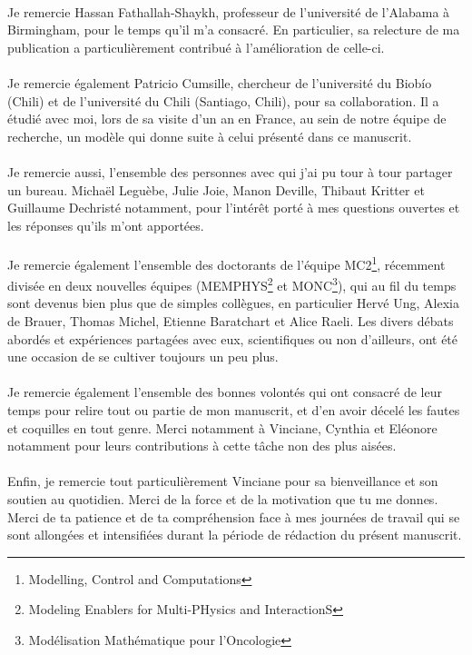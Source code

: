 \paragraph{}
Je remercie Hassan Fathallah-Shaykh, professeur de l'université de l'Alabama à Birmingham, pour le temps qu'il m'a consacré. En particulier, sa relecture de ma publication a particulièrement contribué  à l'amélioration de celle-ci.

\paragraph{}
Je remercie également Patricio Cumsille, chercheur de l'université du Biobío (Chili) et de l'université du Chili (Santiago, Chili), pour sa collaboration. Il a étudié avec moi, lors de sa visite d'un an en France, au sein de notre équipe de recherche, un modèle qui donne suite à celui présenté dans ce manuscrit. 

\paragraph{}
Je remercie aussi, l'ensemble des personnes avec qui j'ai pu tour à tour partager un bureau. Michaël Leguèbe, Julie Joie, Manon Deville, Thibaut Kritter et Guillaume Dechristé notamment, pour l'intérêt porté à mes questions ouvertes et les réponses qu'ils m'ont apportées.

\paragraph{}
Je remercie également l'ensemble des doctorants de l'équipe MC2\footnote{Modelling, Control and Computations}, récemment divisée en deux nouvelles équipes (MEMPHYS\footnote{Modeling Enablers for Multi-PHysics and InteractionS} et MONC\footnote{Modélisation Mathématique pour l'Oncologie}), qui au fil du temps sont devenus bien plus que de simples collègues, en particulier Hervé Ung, Alexia de Brauer, Thomas Michel, Etienne Baratchart et Alice Raeli. Les divers débats abordés et expériences partagées avec eux, scientifiques ou non d'ailleurs, ont été une occasion de se cultiver toujours un peu plus.

\paragraph{}
Je remercie également l'ensemble des bonnes volontés qui ont consacré de leur temps pour relire tout ou partie de mon manuscrit, et d'en avoir décelé les fautes et coquilles en tout genre. 
Merci notamment à Vinciane, Cynthia et Eléonore notamment pour leurs contributions à cette tâche non des plus aisées.

\paragraph{}
Enfin, je remercie tout particulièrement Vinciane pour sa bienveillance et son soutien au quotidien. 
Merci de la force et de la motivation que tu me donnes. 
Merci de ta patience et de ta compréhension face à mes journées de travail qui se sont allongées et intensifiées durant la période de rédaction du présent manuscrit. 